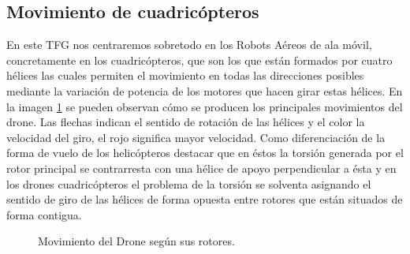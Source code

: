 \subsection{Movimiento de cuadricópteros}
\hspace{1cm} En este TFG nos centraremos sobretodo en los Robots Aéreos de ala móvil, concretamente en los cuadricópteros, que son los que están formados por cuatro hélices las cuales permiten el movimiento en todas las direcciones posibles mediante la variación de potencia de los motores que hacen girar estas hélices. En la imagen \ref{f:Moviento en drones.} se pueden observan cómo se producen los principales movimientos del drone. Las flechas indican el sentido de rotación de las hélices y el color la velocidad del giro, el rojo significa mayor velocidad. Como diferenciación de la forma de vuelo de los helicópteros destacar que en éstos la torsión generada por el rotor principal se contrarresta con una hélice de apoyo perpendicular a ésta y en los drones cuadricópteros el problema de la torsión se solventa asignando el sentido de giro de las hélices de forma opuesta entre rotores que están situados de forma contigua.

\begin{figure}[H]
 \centering
 \caption{Movimiento del Drone según sus rotores.}
 \label{f:Moviento en drones.}
\end{figure}

